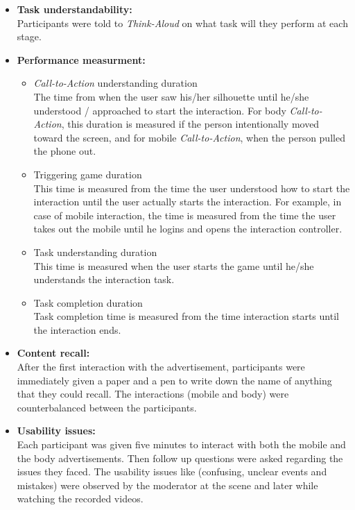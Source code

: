 \begin{itemize}

\item \textbf{Task understandability:} \\
Participants were told to \emph{Think-Aloud} on what task will they perform at each stage. 


\item \textbf{Performance measurment:} 
\begin{itemize}
\item \emph{Call-to-Action} understanding duration \\
The time from when the user saw his/her silhouette until he/she understood / approached to start the interaction. For body \emph{Call-to-Action}, this duration is measured if the person intentionally moved toward the screen, and for mobile \emph{Call-to-Action}, when the person pulled the phone out.

\item Triggering game duration\\
This time is measured from the time the user understood how to start the interaction until the user actually starts the interaction. For example, in case of mobile interaction, the time is measured from the time the user takes out the mobile until he logins and opens the interaction controller.

\item Task understanding duration \\
This time is measured when the user starts the game until he/she understands the interaction task.

\item Task completion duration \\
Task completion time is measured from the time interaction starts until the interaction ends. 

\end{itemize}


\item \textbf{Content recall:} \\
After the first interaction with the advertisement, participants were immediately given a paper and a pen to write down the name of anything that they could recall. The interactions (mobile and body) were counterbalanced between the participants.

\item \textbf{Usability issues:} \\
Each participant was given five minutes to interact with both the mobile and the body advertisements. Then follow up questions were asked regarding the issues they faced. The usability issues like (confusing, unclear events and mistakes) were observed by the moderator at the scene and later while watching the recorded videos. 



\end{itemize}

